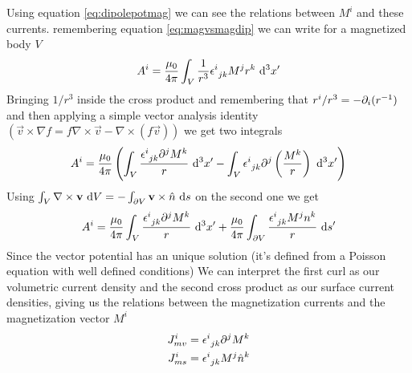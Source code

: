 \documentclass[../electromagnetism.tex]{subfiles}
\begin{document}
Using equation \eqref{eq:dipolepotmag} we can see the relations between $M^i$ and these currents. remembering equation \eqref{eq:magvsmagdip} we can write for a magnetized body $V$
\begin{equation}
	A^i=\frac{\mu_0}{4\pi}\int_V\frac{1}{r^3}\epsilon^{i}_{\ jk}M^jr^k\ \mathrm{d}^3x'
	\label{eq:magpotmagnet}
\end{equation}
Bringing $1/r^3$ inside the cross product and remembering that $r^i/r^3=-\partial_i(r^{-1})$ and then applying a simple vector analysis identity $(\vec{v}\times\nabla f=f\nabla\times\vec{v}-\nabla\times(f\vec{v}))$ we get two integrals
\begin{equation}
	A^i=\frac{\mu_0}{4\pi}\left( \int_V\frac{\epsilon^{i}_{\ jk}\partial^jM^k}{r}\ \mathrm{d}^3x'-\int_V\epsilon^{i}_{\ jk}\partial^j\left( \frac{M^k}{r} \right)\ \mathrm{d}^3x' \right)
	\label{eq:vecpotvsmagint}
\end{equation}
Using $\int_V \nabla\times\mathbf{v}\ \mathrm{d} V=-\int_{\partial V}\mathbf{v}\times\hat{n}\ \mathrm{d} s$ on the second one we get
\begin{equation}
	A^i=\frac{\mu_0}{4\pi}\int_V\frac{\epsilon^{i}_{\ jk}\partial^jM^k}{r}\ \mathrm{d}^3x'+\frac{\mu_0}{4\pi}\int_{\partial V}\frac{\epsilon^{i}_{\ jk}M^jn^k}{r}\ \mathrm{d} s'
	\label{eq:vecpotfinM}
\end{equation}
Since the vector potential has an unique solution (it's defined from a Poisson equation with well defined conditions) We can interpret the first curl as our volumetric current density and the second cross product as our surface current densities, giving us the relations between the magnetization currents and the magnetization vector $M^i$
\begin{equation}
	\begin{aligned}
		J^i_{mv}&=\epsilon^{i}_{\ jk}\partial^jM^k\\
		J^i_{ms}&=\epsilon^{i}_{\ jk}M^j\hat{n}^k
	\end{aligned}
	\label{eq:magcurrentsvsM}
\end{equation}
\end{document}
